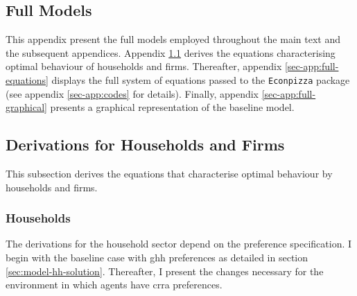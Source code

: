 \documentclass[a4paper,12pt]{article} %
\numberwithin{equation}{section} %
\numberwithin{figure}{section}
\numberwithin{table}{section}
\begin{document}
\newpage
\begin{refsection}
\thispagestyle{plain}
\renewcommand*{\thepage}{A-\arabic{page}} %
\begin{appendices}
\section{Full Models}
\label{sec-app:full}

This appendix present the full models employed throughout the main text and the subsequent appendices. Appendix \ref{sec-app:full-derivations} derives the equations characterising optimal behaviour of households and firms. Thereafter, appendix \ref{sec-app:full-equations} displays the full system of equations passed to the \texttt{Econpizza} package (see appendix \ref{sec-app:codes} for details). Finally, appendix \ref{sec-app:full-graphical} presents a graphical representation of the baseline model.

\subsection{Derivations for Households and Firms}
\label{sec-app:full-derivations}

This subsection derives the equations that characterise optimal behaviour by households and firms.

\subsubsection{Households}
\label{sec-app:full-derivations-households}

The derivations for the household sector depend on the preference specification. I begin with the baseline case with \Gls{ghh} preferences as detailed in section \ref{sec:model-hh-solution}. Thereafter, I present the changes necessary for the environment in which agents have \Gls{crra} preferences.


\end{appendices}
\end{refsection}
\end{document}
